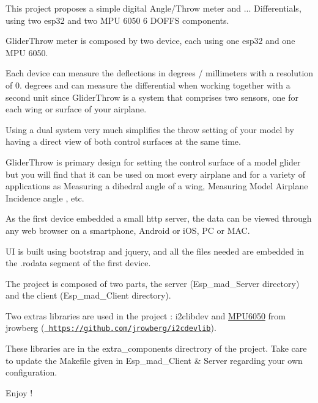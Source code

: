 This project proposes a simple digital Angle/\+Throw meter and ... Differentials, using two esp32 and two M\+PU 6050 6 D\+O\+F\+FS components.

Glider\+Throw meter is composed by two device, each using one esp32 and one M\+PU 6050.

Each device can measure the deflections in degrees / millimeters with a resolution of 0. degrees and can measure the differential when working together with a second unit since Glider\+Throw is a system that comprises two sensors, one for each wing or surface of your airplane.

Using a dual system very much simplifies the throw setting of your model by having a direct view of both control surfaces at the same time.

Glider\+Throw is primary design for setting the control surface of a model glider but you will find that it can be used on most every airplane and for a variety of applications as Measuring a dihedral angle of a wing, Measuring Model Airplane Incidence angle , etc.

As the first device embedded a small http server, the data can be viewed through any web browser on a smartphone, Android or i\+OS, PC or M\+AC.

UI is built using bootstrap and jquery, and all the files needed are embedded in the .rodata segment of the first device.

The project is composed of two parts, the server (Esp\+\_\+mad\+\_\+\+Server directory) and the client (Esp\+\_\+mad\+\_\+\+Client directory).

Two extras libraries are used in the project \+: i2clibdev and \mbox{\hyperlink{class_m_p_u6050}{M\+P\+U6050}} from jrowberg (\href{https://github.com/jrowberg/i2cdevlib}{\texttt{ https\+://github.\+com/jrowberg/i2cdevlib}}).

These libraries are in the extra\+\_\+components directrory of the project. Take care to update the Makefile given in Esp\+\_\+mad\+\_\+\+Client \& Server regarding your own configuration.

Enjoy ! 